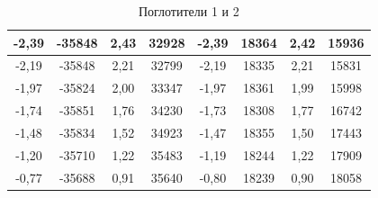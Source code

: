 \documentclass[a4paper, 12pt]{article}
\begin{document}
\begin{table}[h]
\begin{tabular}{|c|c|c|c|c|c|c|c|}
-2,39         & -35848        & 2,43          & 32928         & -2,39         & 18364         & 2,42          & 15936        \\ \hline
-2,19         & -35848        & 2,21          & 32799         & -2,19         & 18335         & 2,21          & 15831        \\ \hline
-1,97         & -35824        & 2,00          & 33347         & -1,97         & 18361         & 1,99          & 15998        \\ \hline
-1,74         & -35851        & 1,76          & 34230         & -1,73         & 18308         & 1,77          & 16742        \\ \hline
-1,48         & -35834        & 1,52          & 34923         & -1,47         & 18355         & 1,50          & 17443        \\ \hline
-1,20         & -35710        & 1,22          & 35483         & -1,19         & 18244         & 1,22          & 17909        \\ \hline
-0,77         & -35688        & 0,91          & 35640         & -0,80         & 18239         & 0,90          & 18058        \\ \hline
\end{tabular}
\caption{Поглотители 1 и 2}
\centering
\end{table}

$ $
\end{document}
